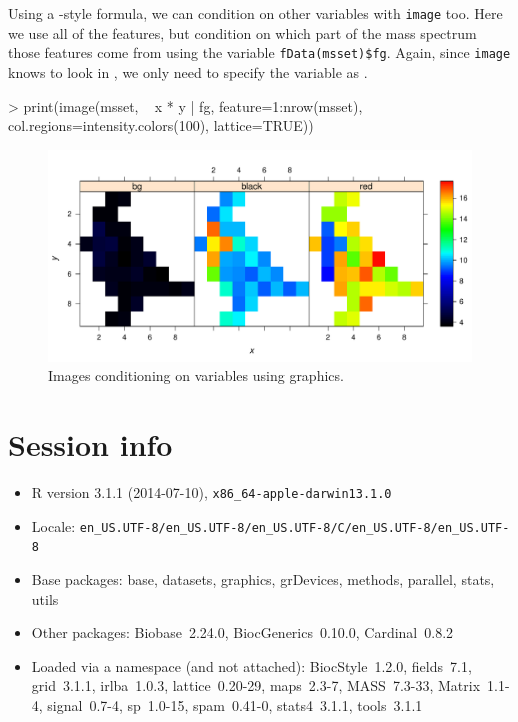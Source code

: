 \documentclass{article}
\begin{document}
Using a -style formula, we can condition on other variables with \verb|image| too. Here we use all of the features, but condition on which part of the mass spectrum those features come from using the variable \verb|fData(msset)$fg|. Again, since \verb|image| knows to look in , we only need to specify the variable as .
\begin{Schunk}
\begin{Sinput}
> print(image(msset, ~ x * y | fg, feature=1:nrow(msset), col.regions=intensity.colors(100), lattice=TRUE))
\end{Sinput}
\end{Schunk}
\begin{figure}
\begin{center}
\includegraphics{Cardinal-plotting-028}
\caption{\small Images conditioning on variables using  graphics.}
\end{center}
\end{figure}

\section{Session info}

\begin{itemize}\raggedright
  \item R version 3.1.1 (2014-07-10), \verb|x86_64-apple-darwin13.1.0|
  \item Locale: \verb|en_US.UTF-8/en_US.UTF-8/en_US.UTF-8/C/en_US.UTF-8/en_US.UTF-8|
  \item Base packages: base, datasets, graphics, grDevices,
    methods, parallel, stats, utils
  \item Other packages: Biobase~2.24.0, BiocGenerics~0.10.0,
    Cardinal~0.8.2
  \item Loaded via a namespace (and not attached):
    BiocStyle~1.2.0, fields~7.1, grid~3.1.1, irlba~1.0.3,
    lattice~0.20-29, maps~2.3-7, MASS~7.3-33, Matrix~1.1-4,
    signal~0.7-4, sp~1.0-15, spam~0.41-0, stats4~3.1.1,
    tools~3.1.1
\end{itemize}
\end{document}
